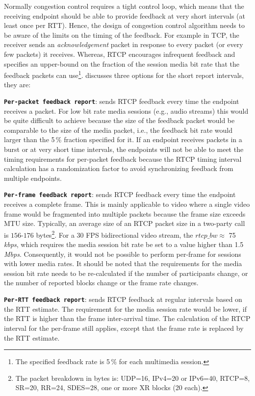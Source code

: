 Normally congestion control requires a tight control loop, which means that
the receiving endpoint should be able to provide feedback at very short
intervals (at least once per RTT). Hence, the design of congestion control
algorithm needs to be aware of the limits on the timing of the feedback. For
example in TCP, the receiver sends an \emph{acknowledgement} packet in
response to every packet (or every few packets) it receives. Whereas, RTCP
encourages infrequent feedback and specifies an upper-bound on the fraction of
the session media bit rate that the feedback packets can use\footnote{The
specified feedback rate is 5\,\% for each multimedia session.}.
\cite{draft.rmcat.feedback} discusses three options for the short report
intervals, they are:

\textbf{\texttt{Per-packet feedback report}}: sends RTCP feedback every time
the endpoint receives a packet. For low bit rate media sessions (e.g., audio
streams) this would be quite difficult to achieve because the size of the
feedback packet would be comparable to the size of the media packet, i.e., the
feedback bit rate would larger than the 5\,\% fraction specified for it. If an
endpoint receives packets in a burst or at very short time intervals, the
endpoints will not be able to meet the timing requirements for per-packet
feedback because the RTCP timing interval calculation has a randomization
factor to avoid synchronizing feedback from multiple endpoints.

\textbf{\texttt{Per-frame feedback report}}: sends RTCP feedback every time
the endpoint receives a complete frame. This is mainly applicable to video
where a single video frame would be fragmented into multiple packets because
the frame size exceeds MTU size. Typically, an average size of an RTCP packet
size in a two-party call is $156$-$176$ bytes\footnote{The packet breakdown in
bytes is: UDP=16, IPv4=20 or IPv6=40, RTCP=8, SR=20, RR=24, SDES=28, one or
more XR blocks (20 each).}. For a 30 FPS bidirectional video stream, the
$rtcp\_bw \approx$ 75\,\emph{kbps}, which requires the media session bit rate
be set to a value higher than 1.5\,\emph{Mbps}. Consequently, it would not be
possible to perform per-frame for sessions with lower media rates. It should
be noted that the requirements for the media session bit rate needs to be 
re-calculated if the number of participants change, or the number of reported
blocks change or the frame rate changes.

\textbf{\texttt{Per-RTT feedback report}}: sends RTCP feedback at regular
intervals based on the RTT estimate. The requirement for the media session
rate would be lower, if the RTT is higher than the frame inter-arrival time.
The calculation of the RTCP interval for the per-frame still applies, except
that the frame rate is replaced by the RTT estimate.

